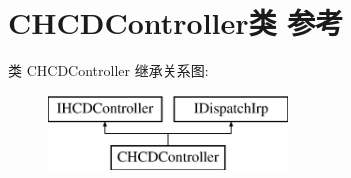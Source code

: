 \hypertarget{class_c_h_c_d_controller}{}\section{C\+H\+C\+D\+Controller类 参考}
\label{class_c_h_c_d_controller}
类 C\+H\+C\+D\+Controller 继承关系图\+:\begin{figure}[H]
\begin{center}
\leavevmode
\includegraphics[height=2.000000cm]{class_c_h_c_d_controller}
\end{center}
\end{figure}
